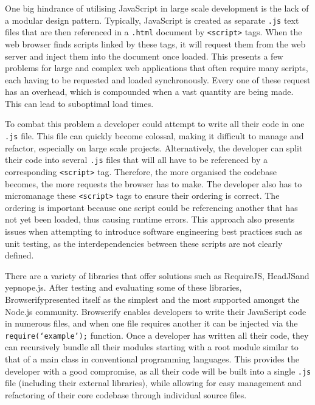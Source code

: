 \documentclass[final]{cmpreport}
\begin{document}
One big hindrance of utilising JavaScript in large scale development is the lack of a modular design pattern. Typically, JavaScript is created as separate \texttt{.js} text files that are then referenced in a \texttt{.html} document by \texttt{<script>} tags. When the web browser finds scripts linked by these tags, it will request them from the web server and inject them into the document once loaded. This presents a few problems for large and complex web applications that often require many scripts, each having to be requested and loaded synchronously. Every one of these request has an overhead, which is compounded when a vast quantity are being made. This can lead to suboptimal load times.

To combat this problem a developer could attempt to write all their code in one \texttt{.js} file. This file can quickly become colossal, making it difficult to manage and refactor, especially on large scale projects. Alternatively, the developer can split their code into several \texttt{.js} files that will all have to be referenced by a corresponding \texttt{<script>} tag. Therefore, the more organised the codebase becomes, the more requests the browser has to make. The developer also has to micromanage these \texttt{<script>} tags to ensure their ordering is correct. The ordering is important because one script could be referencing another that has not yet been loaded, thus causing runtime errors. This approach also presents issues when attempting to introduce software engineering best practices such as unit testing, as the interdependencies between these scripts are not clearly defined.

There are a variety of libraries that offer solutions such as RequireJS\footnotemark, HeadJS\footnotemark and yepnope.js\footnotemark. After testing and evaluating some of these libraries, Browserify\footnotemark presented itself as the simplest and the most supported amongst the Node.js community. Browserify enables developers to write their JavaScript code in numerous files, and when one file requires another it can be injected via the \texttt{require(`example');} function. Once a developer has written all their code, they can recursively bundle all their modules starting with a root module similar to that of a main class in conventional programming languages. This provides the developer with a good compromise, as all their code will be built into a single \texttt{.js} file (including their external libraries), while allowing for easy management and refactoring of their core codebase through individual source files.
\end{document}
